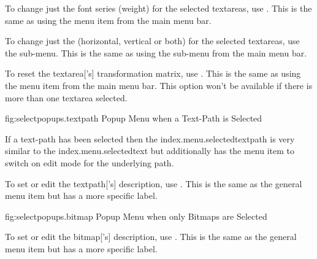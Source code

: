 
To change just the font series (weight) for the selected \glspl{textarea},
use . This is the same as using the
 menu item from the main menu bar.


To change just the  (horizontal, vertical or both) for the
selected \glspl{textarea}, use the 
sub-menu. This is the same as using the
 sub-menu from the main menu
bar.


To reset the \gls{textarea}['s] transformation matrix, use 
. This is the same as using the 
 menu item from the main menu bar.
This option won't be available if there is more than one
\gls{textarea} selected.



\FloatFig
  {fig:selectpopups.textpath}
  {}
  {Popup Menu when a Text-Path is Selected}


If a text-path has been selected then the
\gls{index.menu.selectedtextpath} is very similar to the
\gls{index.menu.selectedtext} but additionally has the
 menu item to switch on edit mode for the
underlying path.


To set or edit the \gls{textpath}['s] description, use
. This is the same as
the general  menu item but has a more specific label.



\FloatFig
  {fig:selectpopups.bitmap}
  {}
  {Popup Menu when only Bitmaps are Selected}


To set or edit the \gls{bitmap}['s] description, use
. This is the same as
the general  menu item but has a more specific label.

